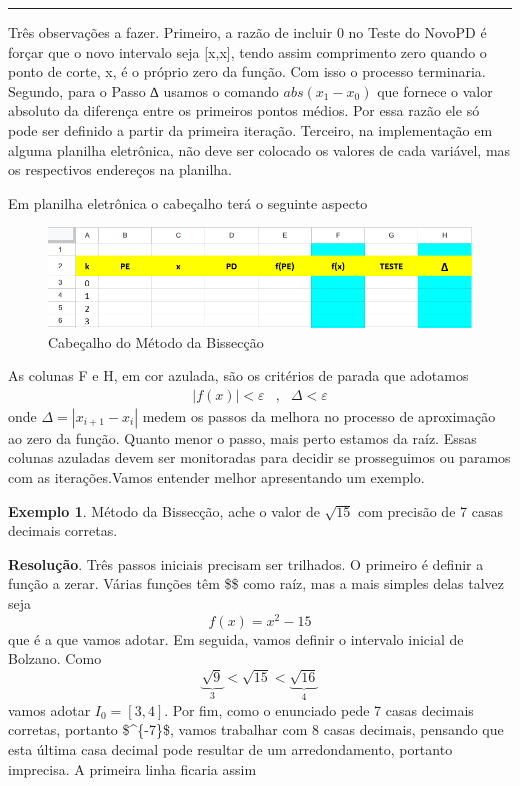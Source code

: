 \documentclass[
  letterpaper,
  DIV=11,
  numbers=noendperiod]{scrreprt}
\begin{document}
\begin{center}\rule{0.5\linewidth}{0.5pt}\end{center}

Três observações a fazer. Primeiro, a razão de incluir 0 no Teste do
NovoPD é forçar que o novo intervalo seja {[}x,x{]}, tendo assim
comprimento zero quando o ponto de corte, x, é o próprio zero da função.
Com isso o processo terminaria. Segundo, para o Passo ∆ usamos o comando
\(abs(x_{1}-x_{0})\) que fornece o valor absoluto da diferença entre os
primeiros pontos médios. Por essa razão ele só pode ser definido a
partir da primeira iteração. Terceiro, na implementação em alguma
planilha eletrônica, não deve ser colocado os valores de cada variável,
mas os respectivos endereços na planilha.

Em planilha eletrônica o cabeçalho terá o seguinte aspecto

\begin{figure}[H]

{\centering \includegraphics{CabBis.png}

}

\caption{Cabeçalho do Método da Bissecção}

\end{figure}%

As colunas F e H, em cor azulada, são os critérios de parada que
adotamos \[\begin{array}{ccc}
\left|f(x)\right|<\varepsilon & , & \Delta<\varepsilon\end{array}\] onde
\(\Delta=\left|x_{i+1}-x_{i}\right|\) medem os passos da melhora no
processo de aproximação ao zero da função. Quanto menor o passo, mais
perto estamos da raíz. Essas colunas azuladas devem ser monitoradas para
decidir se prosseguimos ou paramos com as iterações.Vamos entender
melhor apresentando um exemplo.

\textbf{Exemplo 1}. Método da Bissecção, ache o valor de \(\sqrt{15}\)
com precisão de 7 casas decimais corretas.

\textbf{Resolução}. Três passos iniciais precisam ser trilhados. O
primeiro é definir a função a zerar. Várias funções têm \$\$
como raíz, mas a mais simples delas talvez seja \[f(x)=x^{2}-15\] que é
a que vamos adotar. Em seguida, vamos definir o intervalo inicial de
Bolzano. Como
\[\underbrace{\sqrt{9}}_{3}<\sqrt{15}<\underbrace{\sqrt{16}}_{4}\] vamos
adotar \(I_{0}=[3,4]\). Por fim, como o enunciado pede 7 casas decimais
corretas, portanto \$\^{}\{-7\}\$, vamos trabalhar com 8
casas decimais, pensando que esta última casa decimal pode resultar de
um arredondamento, portanto imprecisa. A primeira linha ficaria assim
\end{document}
